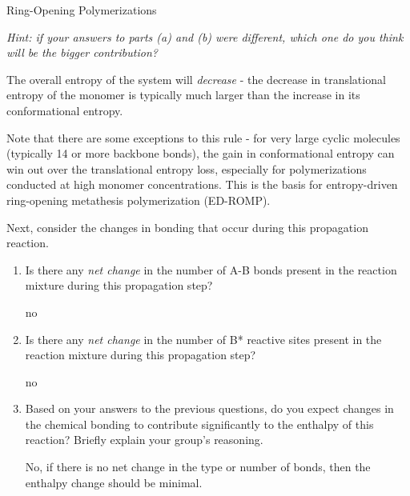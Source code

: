 \begin{activity}{Ring-Opening Polymerizations}
\begin{ctqs}
\begin{enumerate}
				\emph{Hint: if your answers to parts (a) and (b) were different, which one do you think will be the bigger contribution?}
			
				\begin{solution}[1.25in]
					The overall entropy of the system will \emph{decrease} - the decrease in translational entropy of the monomer is typically much larger than the increase in its conformational entropy.
					
					Note that there are some exceptions to this rule - for very large cyclic molecules (typically 14 or more backbone bonds), the gain in conformational entropy can win out over the translational entropy loss, especially for polymerizations conducted at high monomer concentrations.  This is the basis for entropy-driven ring-opening metathesis polymerization (ED-ROMP).
				\end{solution}
			
		\end{enumerate}

	\question Next, consider the changes in bonding that occur during this propagation reaction.
	
		\begin{enumerate}
		
			\item Is there any \emph{net change} in the number of A-B bonds present in the reaction mixture during this propagation step?
			
				\begin{solution}[0.3in]
					no
				\end{solution}
	
			\item Is there any \emph{net change} in the number of B* reactive sites present in the reaction mixture during this propagation step?
			
				\begin{solution}[0.3in]
					no
				\end{solution}
	
			\item Based on your answers to the previous questions, do you expect changes in the chemical bonding to contribute significantly to the enthalpy of this reaction? Briefly explain your group's reasoning.
			
				\begin{solution}[1.25in]
					No, if there is no net change in the type or number of bonds, then the enthalpy change should be minimal.
				\end{solution}
						

\end{enumerate}
\end{ctqs}
\end{activity}
